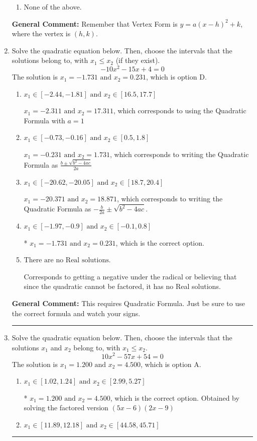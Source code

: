 \documentclass{extbook}[14pt]
\newcommand{\litem}[1]{\item #1

\rule{\textwidth}{0.4pt}}
\begin{document}
\begin{enumerate}
{\begin{enumerate}[label=\Alph*.]
\begin{multicols}{2}
\end{multicols}\item None of the above.\end{enumerate}
\textbf{General Comment:} Remember that Vertex Form is $y = a(x-h)^2+k$, where the vertex is $(h, k)$.
}
\litem{
Solve the quadratic equation below. Then, choose the intervals that the solutions belong to, with $x_1 \leq x_2$ (if they exist).
\[ -10x^{2} -15 x + 4 = 0 \]The solution is \( x_1 = -1.731 \text{ and } x_2 = 0.231 \), which is option D.\begin{enumerate}[label=\Alph*.]
\item \( x_1 \in [-2.44, -1.81] \text{ and } x_2 \in [16.5, 17.7] \)

 $x_1 = -2.311 \text{ and } x_2 = 17.311$, which corresponds to using the Quadratic Formula with $a=1$
\item \( x_1 \in [-0.73, -0.16] \text{ and } x_2 \in [0.5, 1.8] \)

 $x_1 = -0.231 \text{ and } x_2 = 1.731$, which corresponds to writing the Quadratic Formula as $\frac{b \pm \sqrt{b^2 - 4ac}}{2a}$
\item \( x_1 \in [-20.62, -20.05] \text{ and } x_2 \in [18.7, 20.4] \)

 $x_1 = -20.371 \text{ and } x_2 = 18.871$, which corresponds to writing the Quadratic Formula as $-\frac{b}{2a} \pm \sqrt{b^2 - 4ac}$.
\item \( x_1 \in [-1.97, -0.9] \text{ and } x_2 \in [-0.1, 0.8] \)

* $x_1 = -1.731 \text{ and } x_2 = 0.231$, which is the correct option.
\item \( \text{There are no Real solutions.} \)

Corresponds to getting a negative under the radical or believing that since the quadratic cannot be factored, it has no Real solutions.
\end{enumerate}

\textbf{General Comment:} This requires Quadratic Formula. Just be sure to use the correct formula and watch your signs.
}
\litem{
Solve the quadratic equation below. Then, choose the intervals that the solutions $x_1$ and $x_2$ belong to, with $x_1 \leq x_2$.
\[ 10x^{2} -57 x + 54 = 0 \]The solution is \( x_1 = 1.200 \text{ and } x_2 = 4.500 \), which is option A.\begin{enumerate}[label=\Alph*.]
\item \( x_1 \in [1.02, 1.24] \text{ and } x_2 \in [2.99, 5.27] \)

* $x_1 = 1.200 \text{ and } x_2 = 4.500$, which is the correct option. Obtained by solving the factored version $(5x -6)(2x -9)$
\item \( x_1 \in [11.89, 12.18] \text{ and } x_2 \in [44.58, 45.71] \)


\end{enumerate}}
\end{enumerate}
\end{document}
